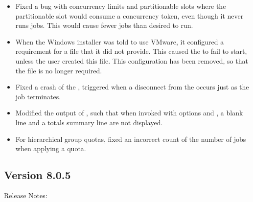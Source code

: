 \begin{itemize}

\item Fixed a bug with concurrency limits and partitionable slots
where the partitionable slot would consume a concurrency token,
even though it never runs jobs.  This would cause fewer jobs
than desired to run.

\item When the Windows installer was told to use VMware,
it configured a requirement for a 
 file that it did not provide.
This caused the  to fail to start,
unless the user created this file.
This configuration has been removed, so that the file is no longer required. 

\item Fixed a crash of the , triggered when a disconnect
from the  occurs just as the job terminates.

\item Modified the output of ,
such that when invoked with options  and ,
a blank line and a totals summary line are not displayed.

\item For hierarchical group quotas, 
fixed an incorrect count of the number of jobs when applying a quota.

\end{itemize}

\subsection*{\label{sec:New-8-0-5}Version 8.0.5}

\noindent Release Notes:

